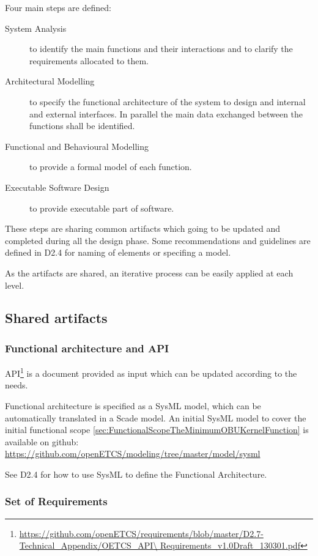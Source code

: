 Four main steps are defined:
\begin{description}
\item [System Analysis] to identify the main functions and their interactions and to clarify the requirements allocated to them.
\item [Architectural Modelling] to specify the functional architecture of the system to design and internal and external interfaces. In parallel  the main data exchanged between the functions shall be identified.
\item [Functional and Behavioural Modelling] to provide a formal model of each function.
\item [Executable Software Design] to provide executable part of software.
\end{description}

These steps are sharing common artifacts which going to be updated and completed during all the design phase. Some recommendations and guidelines are defined in D2.4 for naming of elements or specifing a model.

As the artifacts are shared, an iterative process can be easily applied at each level.

\subsection{Shared artifacts}

\subsubsection{Functional architecture and API}

API\footnote{\url{https://github.com/openETCS/requirements/blob/master/D2.7-Technical_Appendix/OETCS_API\ Requirements_v1.0Draft_130301.pdf}} is a document provided as input which can be updated according to the needs.

Functional architecture is specified as a SysML  model, which can be automatically translated in a Scade model. An initial SysML model to cover the initial functional scope \ref{sec:FunctionalScopeTheMinimumOBUKernelFunction} is available on github: \url{https://github.com/openETCS/modeling/tree/master/model/sysml}

See D2.4 for how to use SysML to define the Functional Architecture.

\subsubsection{Set of Requirements}

